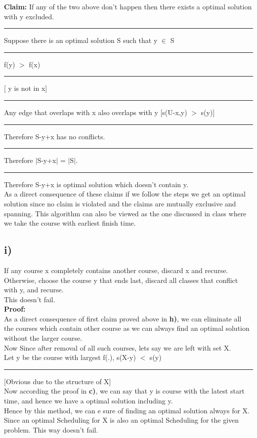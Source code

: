 \documentclass{report}
\begin{document}
\textbf{Claim:} If any of the two above don't happen then there exists a optimal solution with y excluded.\\
\noindent\rule[0.5mm]{1cm}{0pt} Suppose there is an optimal solution S such that y $\in$ S\\
\noindent\rule[0.5mm]{1cm}{0pt} f(y) $>$ f(x) \noindent\rule[0.5mm]{1cm}{0pt} [ y is not in x]\\
\noindent\rule[0.5mm]{1cm}{0pt} Any edge that overlaps with x also overlaps with y [s(U-{x,y}) $>$ s(y)]\\
\noindent\rule[0.5mm]{1cm}{0pt} Therefore S-y+x has no conflicts.\\
\noindent\rule[0.5mm]{1cm}{0pt} Therefore $|$S-y+x$|$ = $|$S$|$.\\
\noindent\rule[0.5mm]{1cm}{0pt} Therefore S-y+x is optimal solution which doesn't contain y.\\
As a direct consequence of these claims if we follow the steps we get an optimal solution since no claim is violated and the claims are mutually exclusive and spanning. This algorithm can also be viewed as the one discussed in class where we take the course with earliest finish time.
\subsection*{i)}
If any course x completely contains another course, discard x and recurse. Otherwise, choose the course y that ends last, discard all classes that conflict with y, and recurse.\\
 This doesn't fail.\\
 \textbf{Proof:}\\
 As a direct consequence of first claim proved above in \textbf{h)}, we can eliminate all the courses which contain other course as we can always find an optimal solution without the larger course.\\
 Now Since after removal of all such courses, lets say we are left with set X.\\
 Let y be the course with largest f(.), s(X-{y}) $<$ s(y) \noindent\rule[0.5mm]{1cm}{0pt} [Obvious due to the structure of X]\\
 Now according the proof in \textbf{c)}, we can say that y is course with the latest start time, and hence we have a optimal solution including y.\\
 Hence by this method, we can e sure of finding an optimal solution always for X.\\
 Since an optimal Scheduling for X is also an optimal Scheduling for the given problem. This way doesn't fail.
\end{document}
